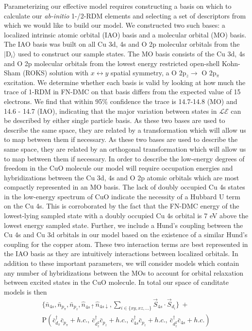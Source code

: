 \documentclass[12pt]{article}
\begin{document}
Parameterizing our effective model requires constructing a basis on which to calculate our \textit{ab-initio} 1-/2-RDM elements and selecting a set of descriptors from which we would like to build our model.
We constructed two such bases: a localized intrinsic atomic orbital (IAO) basis and a molecular orbital (MO) basis.
The IAO basis was built on all Cu 3d, 4s and O 2p molecular orbitals from the $|\text{D}_i\rangle$ used to construct our sample states.
The MO basis consists of the Cu 3d, 4s and O 2p molecular orbitals from the lowest energy restricted open-shell Kohn-Sham (ROKS) solution with $x \leftrightarrow y$ spatial symmetry, a O 2p$_z \rightarrow$ O 2p$_\pi$ excitation.
We determine whether each basis is valid by looking at how much the trace of 1-RDM in FN-DMC on that basis differs from the expected value of 15 electrons.
We find that within 95\% confidence the trace is 14.7-14.8 (MO) and 14.6 - 14.7 (IAO), indicating that the major variation between states in $\mathcal{LE}$ can be described by either single particle basis.
As these two bases are used to describe the same space, they are related by a  transformation which will allow us to map between them if necessary.
As these two bases are used to describe the same space, they are related by an orthogonal transformation which will allow us to map between them if necessary.
In order to describe the low-energy degrees of freedom in the CuO molecule our model will require occupation energies and hybridizations between the Cu 3d, 4s and O 2p atomic orbitals which are most compactly represented in an MO basis.
The lack of doubly occupied Cu 4s states in the low-energy spectrum of CuO indicate the necessity of a Hubbard U term on the Cu 4s.
This is corroborated by the fact that the FN-DMC energy of the lowest-lying sampled state with a doubly occupied Cu 4s orbital is 7 eV above the lowest energy sampled state.
Further, we include a Hund's coupling between the Cu 4s and Cu 3d orbitals in our model based on the existence of a similar Hund's coupling 
for the copper atom.
These two interaction terms are best represented in the IAO basis as they are intuitively interactions between localized orbitals.
In addition to these important parameters, we will consider models which contain any number of hybridizations between the MOs to account for orbital relaxation between excited states in the CuO molecule.
In total our space of canditate models is then 
\begin{equation}
\begin{split}
\{\bar{n}_{4s}, \bar{n}_{p_\pi}, \bar{n}_{p_z}, \hat{n}_{4s\uparrow} \hat{n}_{4s\downarrow},\sum_{i \in \{xy, xz,...\}}\vec{S}_{4s}\cdot \vec{S}_{d_i}\} \ + \\
\text{P}(\bar{c}_{d_\pi}^\dagger \bar{c}_{p_\pi} + h.c.,\ \bar{c}_{d_z^2}^\dagger \bar{c}_{p_z} + h.c.,\ \bar{c}_{4s}^\dagger \bar{c}_{p_z} + h.c.,\ \bar{c}_{d_z^2}^\dagger \bar{c}_{4s} + h.c.)
\end{split}
\label{eq:models}
\end{equation}
\end{document}
